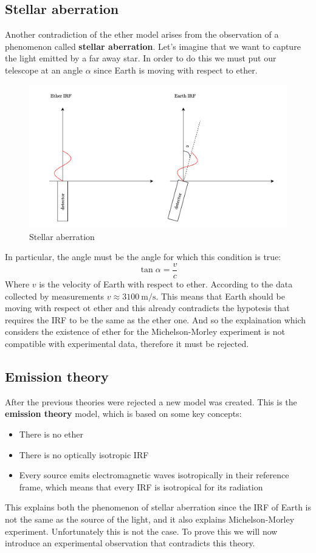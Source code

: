 \subsection{Stellar aberration}
Another contradiction of the ether model arises from the observation of a phenomenon called \textbf{stellar aberration}. Let's imagine that we want to capture the light emitted by a far away star. In order to do this we must put our telescope at an angle $\alpha$ since Earth is moving with respect to ether.
\begin{figure}[H]
  \centering
  \includegraphics[width=0.6\linewidth]{res/svg/stellar_aberration.drawio}
  \caption{Stellar aberration}
\end{figure}
In particular, the angle must be the angle for which this condition is true:
\begin{equation}
  \tan \alpha = \dfrac{v}{c}
\end{equation}
Where $v$ is the velocity of Earth with respect to ether. According to the data collected by measurements $v \approx \qty{3100}{\meter \per \second}$. This means that Earth should be moving with respect ot ether and this already contradicts the hypotesis that requires the IRF to be the same as the ether one. And so the explaination which considers the existence of ether for the Michelson-Morley experiment is not compatible with experimental data, therefore it must be rejected.
\subsection{Emission theory}
After the previous theories were rejected a new model was created. This is the \textbf{emission theory} model, which is based on some key concepts:
\begin{itemize}
  \item There is no ether
  \item There is no optically isotropic IRF
  \item Every source emits electromagnetic waves isotropically in their reference frame, which means that every IRF is isotropical for its radiation
\end{itemize}
This explains both the phenomenon of stellar aberration since the IRF of Earth is not the same as the source of the light, and it also explains Michelson-Morley experiment. Unfortunately this is not the case. To prove this we will now introduce an experimental observation that contradicts this theory.
